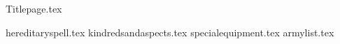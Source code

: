 \documentclass[a4paper,10pt]{article}
\begin{document}
{Titlepage.tex}


{hereditaryspell.tex}
\newpage
{kindredsandaspects.tex}
\newpage
{specialequipment.tex}
\newpage
{armylist.tex}
\end{document}
